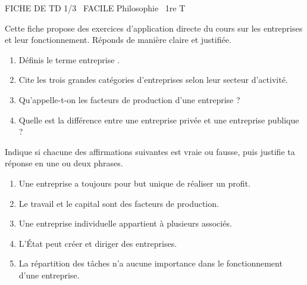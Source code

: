 \documentclass[11pt]{article}
\begin{document}
\begin{tcolorbox}[enhanced,colback=popink,colframe=popink,arc=10pt,boxrule=0pt,left=12pt,right=12pt,top=9pt,bottom=9pt]
{\color{white}\popxbold\small FICHE DE TD 1/3 \textbullet\ FACILE \hfill Philosophie \textbullet\ 1re T\par}
\end{tcolorbox}
\vspace{4pt}
Cette fiche propose des exercices d'application directe du cours sur les entreprises et leur fonctionnement. Réponds de manière claire et justifiée.

\begin{exercice}
\begin{enumerate}
\item Définis le terme \og entreprise \fg.
\item Cite les trois grandes catégories d'entreprises selon leur secteur d'activité.
\item Qu'appelle-t-on les \og facteurs de production \fg d'une entreprise ?
\item Quelle est la différence entre une entreprise privée et une entreprise publique ?
\end{enumerate}
\end{exercice}

\begin{exercice}
Indique si chacune des affirmations suivantes est vraie ou fausse, puis justifie ta réponse en une ou deux phrases.
\begin{enumerate}
\item Une entreprise a toujours pour but unique de réaliser un profit.
\item Le travail et le capital sont des facteurs de production.
\item Une entreprise individuelle appartient à plusieurs associés.
\item L'État peut créer et diriger des entreprises.
\item La répartition des tâches n'a aucune importance dans le fonctionnement d'une entreprise.
\end{enumerate}
\end{exercice}
\end{document}
